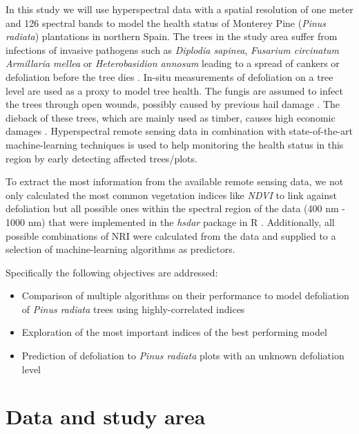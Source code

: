 \documentclass[review]{elsarticle}
\begin{document}
In this study we will use hyperspectral data with a spatial resolution of one meter and 126 spectral bands to model the health status of Monterey Pine (\textit{Pinus radiata}) plantations in northern Spain.
The trees in the study area suffer from infections of invasive pathogens such as \textit{Diplodia sapinea}, \textit{Fusarium circinatum} \textit{Armillaria mellea} or \textit{Heterobasidion annosum} leading to a spread of cankers or defoliation before the tree dies \citep{mesanzaNativeRhizobacteriaBiocontrol2016, iturritxaBiocontrolFusariumCircinatum2017}.
In-situ measurements of defoliation on a tree level are used as a proxy to model tree health.
The fungis are assumed to infect the trees through open wounds, possibly caused by previous hail damage \citep{Iturritxa2014}.
The dieback of these trees, which are mainly used as timber, causes high economic damages \citep{ganleyGlobalClimaticRisk2009}.
Hyperspectral remote sensing data in combination with state-of-the-art machine-learning techniques is used to help monitoring the health status in this region by early detecting affected trees/plots.


To extract the most information from the available remote sensing data, we not only calculated the most common vegetation indices like \textit{NDVI} to link against defoliation but all possible ones within the spectral region of the data (400 nm - 1000 nm) that were implemented in the \textit{hsdar} package in R \citep{hsdar}.
Additionally, all possible combinations of \ac{NRI} were calculated from the data and supplied to a selection of machine-learning algorithms as predictors.



Specifically the following objectives are addressed:

\begin{itemize}
	\item Comparison of multiple algorithms on their performance to model defoliation of \textit{Pinus radiata} trees using highly-correlated indices
	\item Exploration of the most important indices of the best performing model
	\item Prediction of defoliation to \textit{Pinus radiata} plots with an unknown defoliation level
\end{itemize}

\section{Data and study area}
\end{document}
